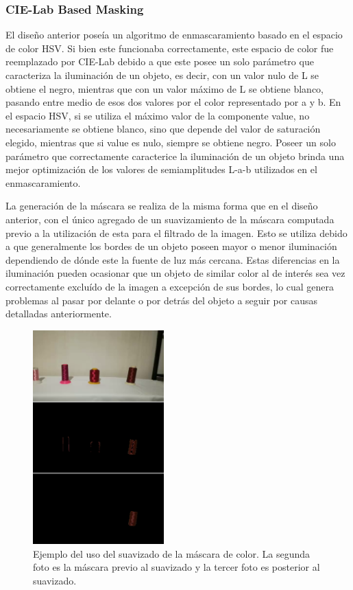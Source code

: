 \subsubsection{CIE-Lab Based Masking}

El diseño anterior poseía un algoritmo de enmascaramiento basado en el espacio de color HSV. Si bien este funcionaba correctamente, este espacio de color fue reemplazado por CIE-Lab debido a que este posee un solo parámetro que caracteriza la iluminación de un objeto, es decir, con un valor nulo de L se obtiene el negro, mientras que con un valor máximo de L se obtiene blanco, pasando entre medio de esos dos valores por el color representado por a y b. En el espacio HSV, si se utiliza el máximo valor de la componente value, no necesariamente se obtiene blanco, sino que depende del valor de saturación elegido, mientras que si value es nulo, siempre se obtiene negro. Poseer un solo parámetro que correctamente caracterice la iluminación de un objeto brinda una mejor optimización de los valores de semiamplitudes L-a-b utilizados en el enmascaramiento. 

La generación de la máscara se realiza de la misma forma que en el diseño anterior, con el único agregado de un suavizamiento de la máscara computada previo a la utilización de esta para el filtrado de la imagen. Esto se utiliza debido a que generalmente los bordes de un objeto poseen mayor o menor iluminación dependiendo de dónde este la fuente de luz más cercana. Estas diferencias en la iluminación pueden ocasionar que un objeto de similar color al de interés sea vez correctamente excluído de la imagen a excepción de sus bordes, lo cual genera problemas al pasar por delante o por detrás del objeto a seguir por causas detalladas anteriormente.

\begin{figure}[H]
	\centering
	\includegraphics[width=0.45\textwidth]{Imagenes/medianblur.png}
	\caption{Ejemplo del uso del suavizado de la máscara de color. La segunda foto es la máscara previo al suavizado y la tercer foto es posterior al suavizado.}
	\label{fig:medianblur}
\end{figure}

